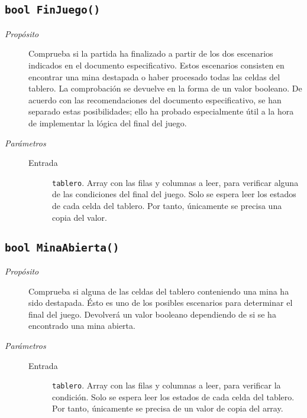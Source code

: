 \documentclass[12pt]{article}
\begin{document}
\subsection*{\texttt{bool FinJuego()}}

\begin{description}

\item[\emph{Propósito}]

Comprueba si la partida ha finalizado a partir de los dos escenarios indicados
en el documento especificativo. Estos escenarios consisten en encontrar una mina
destapada o haber procesado todas las celdas del tablero. La comprobación se
devuelve en la forma de un valor booleano. De acuerdo con las recomendaciones
del documento especificativo, se han separado estas posibilidades; ello ha
probado especialmente útil a la hora de implementar la lógica del final del
juego.

\item[\emph{Parámetros}] \leavevmode

\begin{description}

\item[Entrada] \texttt{tablero}. Array con las filas y columnas a leer,
para verificar alguna de las condiciones del final del juego. Solo se espera
leer los estados de cada celda del tablero. Por tanto, únicamente se precisa una
copia del valor.

\end{description}

\end{description}

\subsection*{\texttt{bool MinaAbierta()}}

\begin{description}

\item[\emph{Propósito}]

Comprueba si alguna de las celdas del tablero conteniendo una mina ha sido
destapada. Ésto es uno de los posibles escenarios para determinar el final del
juego. Devolverá un valor booleano dependiendo de si se ha encontrado una mina
abierta.

\item[\emph{Parámetros}] \leavevmode

\begin{description}

\item[Entrada] \texttt{tablero}. Array con las filas y columnas a leer,
para verificar la condición. Solo se espera leer los estados de cada celda del
tablero. Por tanto, únicamente se precisa de un valor de copia del array.

\end{description}

\end{description}
\end{document}
